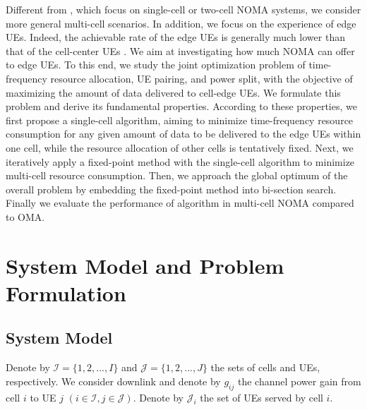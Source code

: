 \documentclass[10pt,journal,final,finalsubmission,twocolumn]{IEEEtran}
\begin{document}
Different from \cite{Do1, Do2, Guo, Pei}, which focus on single-cell or two-cell NOMA systems, we consider more general multi-cell scenarios. In addition, we focus on the experience of edge UEs. Indeed, the achievable rate of the edge UEs is generally much lower than that of the cell-center UEs \cite{Dai}. We aim at investigating how much NOMA can offer to edge UEs. To this end, we study the joint optimization problem of time-frequency resource allocation, UE pairing, and power split, with the objective of maximizing the amount of data delivered to cell-edge UEs. We formulate this problem and derive its fundamental properties. According to these properties, we first propose a single-cell algorithm, aiming to minimize time-frequency resource consumption for any given amount of data to be delivered to the edge UEs within one cell, while the resource allocation of other cells is tentatively fixed. Next, we iteratively apply a fixed-point method with the single-cell algorithm to minimize multi-cell resource consumption. Then, we approach the global optimum of the overall problem by embedding the fixed-point method into bi-section search. Finally we evaluate the performance of algorithm in multi-cell NOMA compared to OMA.

\section{System Model and Problem Formulation} \label{Sec:SystemModel}

\subsection{System Model}\label{Preliminaries}

Denote by $\mathcal{I} = \{1,2,...,I \}$ and $\mathcal{J} = \{1,2,...,J\}$ the sets of cells and UEs, respectively. 
We consider downlink and denote by $g_{ij}$ the channel power gain from cell $i$ to UE $j$ $(i \in \mathcal{I}, j \in \mathcal{J})$. Denote by $\mathcal{J}_i$ the set of UEs served by cell $i$.
\end{document}
